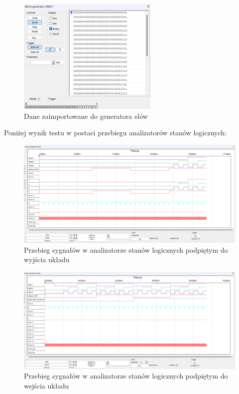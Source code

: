 \documentclass[a4paper]{article}
\begin{document}
\begin{figure}[H]
    \centering
    \includegraphics[width=0.6\textwidth]{door_controller_test_word_generator.png}
    \caption{Dane zaimportowane do generatora słów}
\end{figure}

Poniżej wynik testu w postaci przebiegu analizatorów stanów logicznych:

\begin{figure}[H]
    \centering
    \includegraphics[width=\textwidth]{door_controller_test_logic_analizer_xla1.png}
    \caption{Przebieg sygnałów w analizatorze stanów logicznych podpiętym do wyjścia układu}
\end{figure}

\begin{figure}[H]
    \centering
    \includegraphics[width=\textwidth]{door_controller_test_logic_analizer_xla2.png}
    \caption{Przebieg sygnałów w analizatorze stanów logicznych podpiętym do wejścia układu}
\end{figure}
\end{document}
